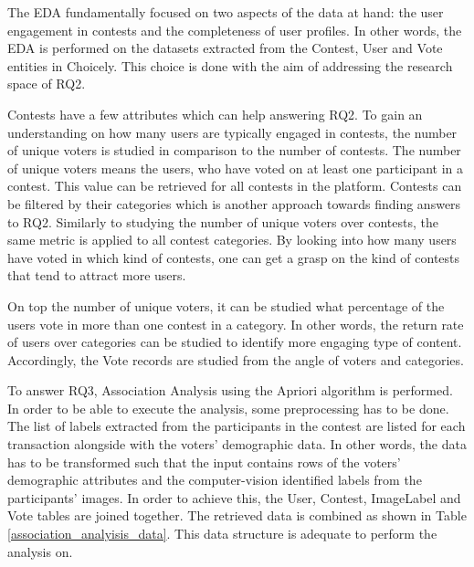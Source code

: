     The EDA fundamentally focused on two aspects of the data at hand: the user engagement in contests and the completeness of user profiles. In other words, the EDA is performed on the datasets extracted from the Contest, User and Vote entities in Choicely. This choice is done with the aim of addressing the research space of RQ2.  
    
    Contests have a few attributes which can help answering RQ2. To gain an understanding on how many users are typically engaged in contests, the number of unique voters is studied in comparison to the number of contests. The number of unique voters means the users, who have voted on at least one participant in a contest. This value can be retrieved for all contests in the platform. Contests can be filtered by their categories which is another approach towards finding answers to RQ2. Similarly to studying the number of unique voters over contests, the same metric is applied to all contest categories. By looking into how many users have voted in which kind of contests, one can get a grasp on the kind of contests that tend to attract more users.

    On top the number of unique voters, it can be studied what percentage of the users vote in more than one contest in a category. In other words, the return rate of users over categories can be studied to identify more engaging type of content. Accordingly, the Vote records are studied from the angle of voters and categories.

    To answer RQ3, Association Analysis using the Apriori algorithm is performed. In order to be able to execute the analysis, some preprocessing has to be done. The list of labels extracted from the participants in the contest are listed for each transaction alongside with the voters' demographic data. In other words, the data has to be transformed such that the input contains rows of the voters' demographic attributes and the computer-vision identified labels from the participants' images. In order to achieve this, the User, Contest, ImageLabel and Vote tables are joined together. The retrieved data is combined as shown in Table \ref{association_analyisis_data}. This data structure is adequate to perform the analysis on.

